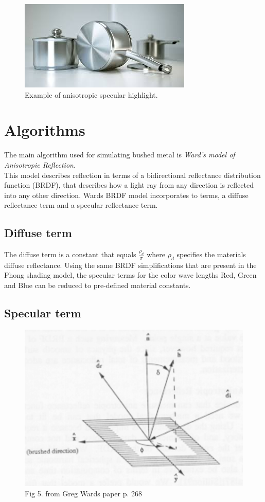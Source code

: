 \documentclass{acmsiggraph}               %
\begin{document}
\begin{figure}[!ht]
    \centering
    \includegraphics[width=0.7\columnwidth]{highlight.jpg}
    \caption{Example of anisotropic specular highlight.}
    \label{anisotropic_highlight}
\end{figure}

\section{Algorithms}
The main algorithm used for simulating bushed metal is \textit{Ward's model of
Anisotropic Reflection}\cite{GregWard}. \\

This model describes reflection in terms of a bidirectional reflectance
distribution function (BRDF), that describes how a light ray from any direction
is reflected into any other direction. Wards BRDF model incorporates to terms,
a diffuse reflectance term and a specular reflectance term.

\subsection{Diffuse term}

The diffuse term is a constant that equals $\frac{\rho_d}{\pi}$ where $\rho_d$
specifies the materials diffuse reflectance. Using the same BRDF
simplifications that are present in the Phong shading model, the specular terms
for the color wave lengths Red, Green and Blue can be reduced to pre-defined
material constants.

\subsection{Specular term}

\begin{figure}[!ht]
    \centering
    \includegraphics[width=0.7\columnwidth]{figure.png}
    \caption{Fig 5. from Greg Wards paper p. 268}
    \label{figure}
\end{figure}
\end{document}
